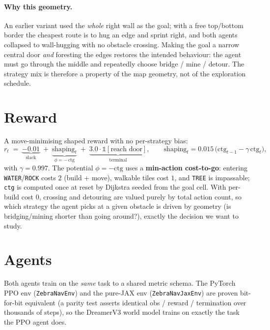 \documentclass[11pt]{article}
\newcommand{\code}[1]{\texttt{#1}}
\begin{document}
\paragraph{Why this geometry.} An earlier variant used the \emph{whole} right wall
as the goal; with a free top/bottom border the cheapest route is to hug an edge and
sprint right, and both agents collapsed to wall-hugging with no obstacle crossing.
Making the goal a narrow central door \emph{and} foresting the edges restores the
intended behaviour: the agent must go through the middle and repeatedly choose
bridge / mine / detour. The strategy mix is therefore a property of the map
geometry, not of the exploration schedule.

\section{Reward}

A move-minimising shaped reward with no per-strategy bias:
\[
r_t \;=\; \underbrace{-0.01}_{\text{slack}}
\;+\;\underbrace{\text{shaping}_t}_{\phi=-\,\text{ctg}}
\;+\;\underbrace{3.0\cdot\mathbb{1}[\text{reach door}]}_{\text{terminal}},
\qquad
\text{shaping}_t = 0.015\,\big(\text{ctg}_{t-1}-\gamma\,\text{ctg}_t\big),
\]
with $\gamma=0.997$. The potential $\phi=-\text{ctg}$ uses a \textbf{min-action
cost-to-go}: entering \code{WATER}/\code{ROCK} costs $2$ (build + move), walkable
tiles cost $1$, and \code{TREE} is impassable; \code{ctg} is computed once at reset
by Dijkstra seeded from the goal cell. With per-build cost $0$, crossing and
detouring are valued purely by total action count, so which strategy the agent
picks at a given obstacle is driven by geometry (is bridging/mining shorter than
going around?), exactly the decision we want to study.

\section{Agents}

Both agents train on the \emph{same} task to a shared metric schema. The PyTorch
PPO env (\code{ZebraNavEnv}) and the pure-JAX env (\code{ZebraNavJaxEnv}) are
proven bit-for-bit equivalent (a parity test asserts identical obs / reward /
termination over thousands of steps), so the DreamerV3 world model trains on
exactly the task the PPO agent does.
\end{document}
